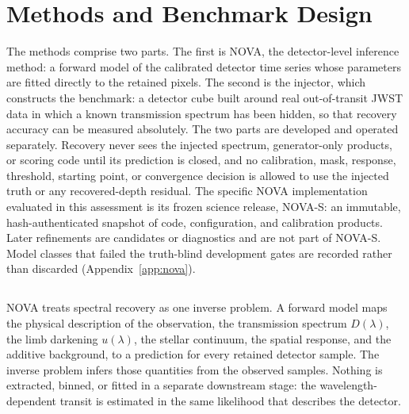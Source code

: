 \section{Methods and Benchmark Design}
\label{sec:methods}


The methods comprise two parts. The first is NOVA, the detector-level
inference method: a forward model of the calibrated detector time series
whose parameters are fitted directly to the retained pixels. The second is
the injector, which constructs the benchmark: a detector cube built around
real out-of-transit JWST data in which a known transmission spectrum has
been hidden, so that recovery accuracy can be measured absolutely. The two
parts are developed and operated separately. Recovery never sees the
injected spectrum, generator-only products, or scoring code until its
prediction is closed, and no calibration, mask, response, threshold,
starting point, or convergence decision is allowed to use the injected
truth or any recovered-depth residual. The specific NOVA implementation
evaluated in this assessment is its frozen science release, NOVA-S: an
immutable, hash-authenticated snapshot of code, configuration, and
calibration products. Later refinements are candidates or diagnostics and
are not part of NOVA-S. Model classes that failed the truth-blind
development gates are recorded rather than discarded
(Appendix~\ref{app:nova}).

\subsection{\nova{}}


NOVA treats spectral recovery as one inverse problem. A forward model maps
the physical description of the observation, the transmission spectrum
$D(\lambda)$, the limb darkening $u(\lambda)$, the stellar continuum, the
spatial response, and the additive background, to a prediction for every
retained detector sample. The inverse problem infers those quantities from
the observed samples. Nothing is extracted, binned, or fitted in a
separate downstream stage: the wavelength-dependent transit is estimated
in the same likelihood that describes the detector.

